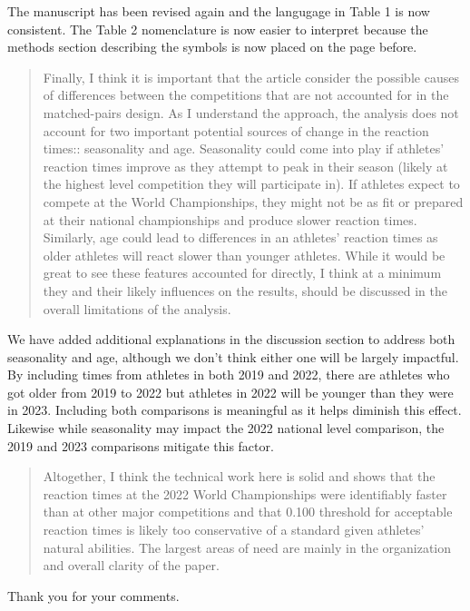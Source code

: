 \documentclass[12pt]{article}
\newenvironment{comment}%
{\begin{quotation}\noindent\small\it\color{darkblue}\ignorespaces%
}{\end{quotation}}
\begin{document}
The manuscript has been revised again and the langugage in Table 1 is now
consistent.  The Table 2 nomenclature is now easier to interpret because the
methods section describing the symbols is now placed on the page before. 



\begin{comment}
Finally, I think it is important that the article consider the possible causes
of differences between the competitions that are not accounted for in the
matched-pairs design. As I understand the approach, the analysis does not
account for two important potential sources of change in the reaction times::
seasonality and age. Seasonality could come into play if athletes' reaction
times improve as they attempt to peak in their season (likely at the highest
level competition they will participate in). If athletes expect to compete at
the World Championships, they might not be as fit or prepared at their national
championships and produce slower reaction times. Similarly, age could lead to
differences in an athletes' reaction times as older athletes will react slower
than younger athletes. While it would be great to see these features accounted
for directly, I think at a minimum they and their likely influences on the
results, should be discussed in the overall limitations of the analysis.
\end{comment}


We have added additional explanations in the discussion section to address both
seasonality and age, although we don't think either one will be largely
impactful.  By including times from athletes in both 2019 and 2022, there are
athletes who got older from 2019 to 2022 but athletes in 2022 will be younger
than they were in 2023.  Including both comparisons is meaningful as it helps
diminish this effect.  Likewise while seasonality may impact the 2022 national
level comparison, the 2019 and 2023 comparisons mitigate this factor.

\begin{comment}
Altogether, I think the technical work here is solid and shows that the reaction
times at the 2022 World Championships were identifiably faster than at other
major competitions and that 0.100 threshold for acceptable reaction times is
likely too conservative of a standard given athletes' natural abilities. The
largest areas of need are mainly in the organization and overall clarity of the
paper.
\end{comment}

Thank you for your comments.




\end{document}

